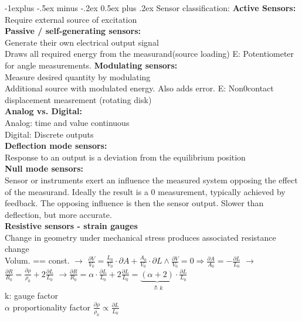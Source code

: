 \documentclass[5pt,landscape]{article}
\makeatletter
\renewcommand{\subsection}{\@startsection{subsection}{2}{0mm}%
                                {-1explus -.5ex minus -.2ex}%
                                {0.5ex plus .2ex}%
                                {\normalfont\normalsize\bfseries}}
\makeatother
\begin{document}
\begin{multicols*}{5}
\subsection{Sensor classification:}
\textbf{Active Sensors:}\\
Require external source of excitation\\
\textbf{Passive / self-generating sensors:}\\
Generate their own electrical output signal\\
Draws all required energy from the measurand(source loading)
E: Potentiometer for angle measurements.
\textbf{Modulating sensors:}\\
Measure desired quantity by modulating\\
Additional source with modulated energy. Also adds error.
E: Non0contact displacement measrement (rotating disk)\\
\textbf{Analog vs. Digital:}\\
Analog: time and value continuous\\
Digital: Discrete outputs\\
\textbf{Deflection mode sensors:}\\
Response to an output is a deviation from the equilibrium position\\
\textbf{Null mode sensors:}\\
Sensor or instruments exert an influence the measured system opposing the effect of the measurand. Ideally the result is a 0 measurement, typically achieved by feedback. The opposing influence is then the sensor output.
Slower than deflection, but more accurate.\\
\textbf{Resistive sensors - strain gauges}\\
Change in geometry under mechanical stress produces associated resistance change\\
Volum. == const. $ \rightarrow $ $ \frac{\partial V}{V_{0}}=\frac{L_{0}}{V_{0}} \cdot \partial A+\frac{A_{0}}{V_{0}} \cdot \partial L \wedge \frac{\partial V}{V_{0}}=0 \Rightarrow \frac{\partial A}{A_{0}}=-\frac{\partial L}{L_{0}}  $ $ \rightarrow $ $ \frac{\partial R}{R_{0}}=\frac{\partial \rho}{\rho_{0}}+2 \frac{\partial L}{L_{0}} $ $ \rightarrow $$ \frac{\partial R}{R_{0}}=\alpha \cdot \frac{\partial L}{L_{0}}+2 \frac{\partial L}{L_{0}}=\underbrace{(\alpha+2)}_{\triangleq k} \cdot \frac{\partial L}{L_{0}} $\\
k: gauge factor\\
$ \alpha $ proportionality factor $  \frac{\partial \rho}{\rho_{0}} \propto \frac{\partial L}{L_{0}}$
$$
\end{multicols*}
\end{document}
